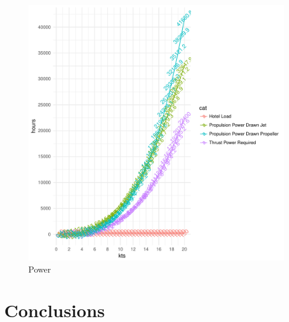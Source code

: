 \documentclass{article}\usepackage[]{graphicx}\usepackage[]{color}
\makeatletter
\def\maxwidth{ %
  \ifdim\Gin@nat@width>\linewidth
    \linewidth
  \else
    \Gin@nat@width
  \fi
}
\newenvironment{knitrout}{}{} %
\makeatother
\begin{document}
\begin{figure}
\begin{knitrout}
\color{fgcolor}

{\centering \includegraphics[width=\maxwidth]{figures/plots-plot_power-1} 

}



\end{knitrout}
\caption{Power}
\label{fig:Power_plot}
\end{figure}


\section{Conclusions}

\end{document}
